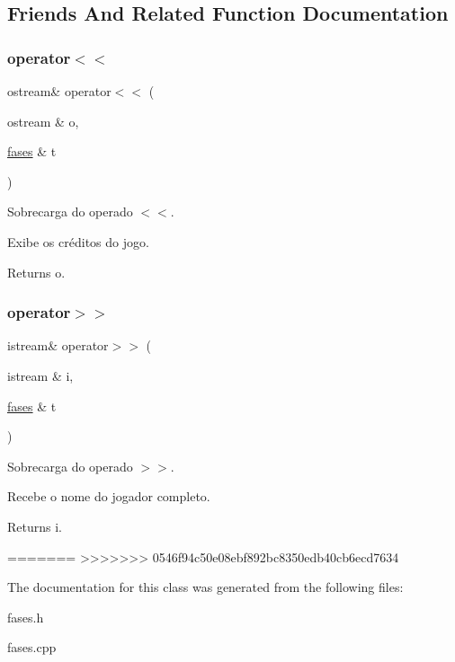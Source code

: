

\subsection{Friends And Related Function Documentation}
\mbox{\label{classfases_a918b9b50f8716407ea46bdfbf5848271}} 
\subsubsection{\texorpdfstring{operator$<$$<$}{operator<<}}
{\footnotesize\ttfamily ostream\& operator$<$$<$ (\begin{DoxyParamCaption}\item[{ostream \&}]{o,  }\item[{\mbox{\hyperlink{classfases}{fases}} \&}]{t }\end{DoxyParamCaption})\hspace{0.3cm}{\ttfamily [friend]}}



Sobrecarga do operado $<$$<$. 

Exibe os créditos do jogo. \begin{DoxyReturn}{Returns}
o. 
\end{DoxyReturn}
\mbox{\label{classfases_a24bc7622c7828e59917da245c41920d8}} 
\subsubsection{\texorpdfstring{operator$>$$>$}{operator>>}}
{\footnotesize\ttfamily istream\& operator$>$$>$ (\begin{DoxyParamCaption}\item[{istream \&}]{i,  }\item[{\mbox{\hyperlink{classfases}{fases}} \&}]{t }\end{DoxyParamCaption})\hspace{0.3cm}{\ttfamily [friend]}}



Sobrecarga do operado $>$$>$. 

Recebe o nome do jogador completo. \begin{DoxyReturn}{Returns}
i. 
\end{DoxyReturn}
=======
>>>>>>> 0546f94c50e08ebf892bc8350edb40cb6ecd7634


The documentation for this class was generated from the following files\+:\begin{DoxyCompactItemize}
\item 
fases.\+h\item 
fases.\+cpp\end{DoxyCompactItemize}
